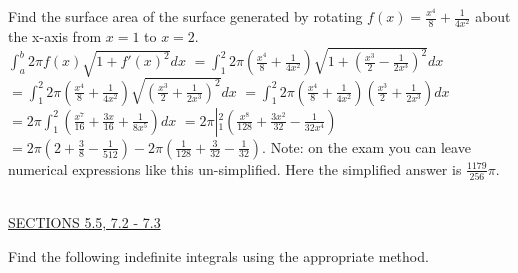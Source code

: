 \documentclass{exam}
\begin{document}
\begin{questions}
\question Find the surface area of the surface generated by rotating $f(x) = \frac{x^4}{8} + \frac{1}{4x^2}$ about the x-axis from $x=1$ to $x=2$.
\\ {\color{red} $\displaystyle\int_a^b 2\pi f(x)\sqrt{1+f'(x)^2}dx $ $  = \displaystyle\int_1^2 2\pi \left(  \frac{x^4}{8} + \frac{1}{4x^2} \right) \sqrt{ 1 + \left( \frac{x^3}{2} - \frac{1}{2x^3}\right)^2}dx$ $  = \displaystyle\int_1^2 2\pi \left(  \frac{x^4}{8} + \frac{1}{4x^2} \right) \sqrt{ \left( \frac{x^3}{2} + \frac{1}{2x^3}\right)^2}dx$ $  = \displaystyle\int_1^2 2\pi \left(  \frac{x^4}{8} + \frac{1}{4x^2} \right) \left( \frac{x^3}{2} + \frac{1}{2x^3}\right)dx$ $ = 2\pi \displaystyle\int_1^2 \left( \frac{x^7}{16} + \frac{3x}{16} + \frac{1}{8x^5} \right)  dx$ $ = 2\pi \left|_1^2 \left( \frac{x^8}{128} + \frac{3x^2}{32} - \frac{1}{32x^4} \right) \right.$ $ = 2\pi \left(2 + \frac{3}{8} - \frac{1}{512 }\right) - 2\pi\left( \frac{1}{128} + \frac{3}{32} - \frac{1}{32}\right)$.  Note: on the exam you can leave numerical expressions like this un-simplified.  Here the simplified answer is $\frac{1179}{256}\pi$. }

    \newpage\thispagestyle{empty}

\ \\
\underline{SECTIONS 5.5, 7.2 - 7.3 }
\thispagestyle{empty}

\question Find the following indefinite integrals using the appropriate method.  
\begin{parts}
\end{parts}
\end{questions}
\end{document}

